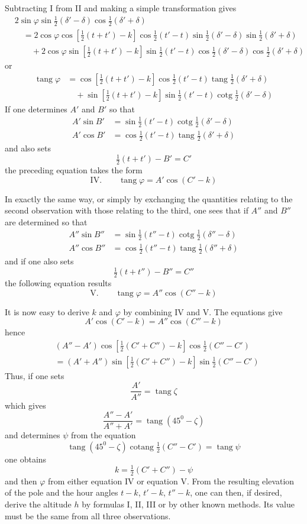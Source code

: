 Subtracting I from II and making a simple transformation gives
\[
\begin{aligned}
&2\sin\varphi\sin\tfrac12(\delta'-\delta)\cos\tfrac12(\delta'+\delta)\\
&\quad=2\cos\varphi\cos[\tfrac12(t+t')-k]\cos\tfrac12(t'-t)\sin\tfrac12(\delta'-\delta)\sin\tfrac12(\delta'+\delta)\\
&\qquad+2\cos\varphi\sin[\tfrac12(t+t')-k]\sin\tfrac12(t'-t)\cos\tfrac12(\delta'-\delta)\cos\tfrac12(\delta'+\delta)
\end{aligned}
\]
or
\[
\begin{aligned}
\operatorname{tang}\varphi&=\cos[\tfrac12(t+t')-k]\cos\tfrac12(t'-t)\operatorname{tang}\tfrac12(\delta'+\delta)\\
&\quad+\sin[\tfrac12(t+t')-k]\sin\tfrac12(t'-t)\operatorname{cotg}\tfrac12(\delta'-\delta)
\end{aligned}
\]
%
If one determines $A'$ and $B'$ so that
\[
\begin{aligned}
A'\sin B'&=\sin\tfrac12(t'-t)\operatorname{cotg}\tfrac12(\delta'-\delta)\\
A'\cos B'&=\cos\tfrac12(t'-t)\operatorname{tang}\tfrac12(\delta'+\delta)
\end{aligned}
\]
and also sets
\[
\tfrac12(t+t')-B'=C'
\]
the preceding equation takes the form
\[
\mathrm{IV.}\qquad\operatorname{tang}\varphi=A'\cos(C'-k)
\]

In exactly the same way, or simply by exchanging the quantities relating to the second observation with those relating to the third, one sees that if $A''$ and $B''$ are determined so that
\[
\begin{aligned}
A''\sin B''&=\sin\tfrac12(t''-t)\operatorname{cotg}\tfrac12(\delta''-\delta)\\
A''\cos B''&=\cos\tfrac12(t''-t)\operatorname{tang}\tfrac12(\delta''+\delta)
\end{aligned}
\]
and if one also sets
\[
\tfrac12(t+t'')-B''=C''
\]
the following equation results
\[
\mathrm{V.}\qquad\operatorname{tang}\varphi=A''\cos(C''-k)
\]

It is now easy to derive $k$ and $\varphi$ by combining IV and V. The equations give
\[
A'\cos(C'-k)=A''\cos(C''-k)
\]
hence
\[
\begin{aligned}
&(A''-A')\cos[\tfrac12(C'+C'')-k]\cos\tfrac12(C''-C')\\
&=(A'+A'')\sin[\tfrac12(C'+C'')-k]\sin\tfrac12(C''-C')
\end{aligned}
\]
Thus, if one sets
\[
\frac{A'}{A''}=\operatorname{tang}\zeta
\]
which gives
\[
\frac{A''-A'}{A''+A'}=\operatorname{tang}(45^0-\zeta)
\]
%
and determines $\psi$ from the equation
\[
\operatorname{tang}(45^0-\zeta)\operatorname{cotang}\tfrac12(C''-C')=\operatorname{tang}\psi
\]
one obtains
\[
k=\tfrac12(C'+C'')-\psi
\]
and then $\varphi$ from either equation IV or equation V. From the resulting elevation of the pole and the hour angles $t-k$, $t'-k$, $t''-k$, one can then, if desired, derive the altitude $h$ by formulas I, II, III or by other known methods. Its value must be the same from all three observations.

